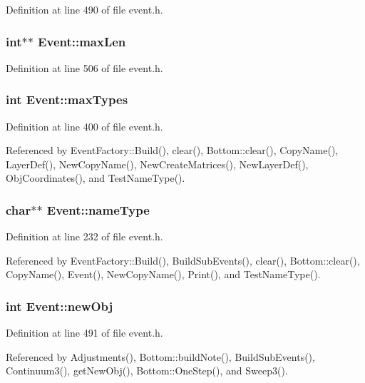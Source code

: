 Definition at line 490 of file event.h.
\subsubsection{\setlength{\rightskip}{0pt plus 5cm}int$\ast$$\ast$ {\bf Event::max\-Len}}\label{classEvent_o55}




Definition at line 506 of file event.h.
\subsubsection{\setlength{\rightskip}{0pt plus 5cm}int {\bf Event::max\-Types}}\label{classEvent_o17}




Definition at line 400 of file event.h.

Referenced by Event\-Factory::Build(), clear(), Bottom::clear(), Copy\-Name(), Layer\-Def(), New\-Copy\-Name(), New\-Create\-Matrices(), New\-Layer\-Def(), Obj\-Coordinates(), and Test\-Name\-Type().
\subsubsection{\setlength{\rightskip}{0pt plus 5cm}char$\ast$$\ast$ {\bf Event::name\-Type}}\label{classEvent_o10}




Definition at line 232 of file event.h.

Referenced by Event\-Factory::Build(), Build\-Sub\-Events(), clear(), Bottom::clear(), Copy\-Name(), Event(), New\-Copy\-Name(), Print(), and Test\-Name\-Type().
\subsubsection{\setlength{\rightskip}{0pt plus 5cm}int {\bf Event::new\-Obj}}\label{classEvent_o44}




Definition at line 491 of file event.h.

Referenced by Adjustments(), Bottom::build\-Note(), Build\-Sub\-Events(), Continuum3(), get\-New\-Obj(), Bottom::One\-Step(), and Sweep3().

